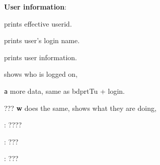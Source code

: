 \textbf{User information}:
\begin{compactenum}
	\item [\symbolcoreutils]  prints effective userid.

	\item [\symbolcoreutils]  prints user's login name.

	\item [\symbolcoreutils]  prints user information.

	\item [\symbolcoreutils]  shows who is logged on,
	\item [\texttt{a}] more data, same as bdprtTu + login.

	\item [???] \textbf{w} does the same, shows what they are doing,

	\item [\symbolcoreutils] : \dotfill ????

	\item [\symbolcoreutils] : \dotfill ???

	\item [\symbolcoreutils] : \dotfill ???
\end{compactenum}